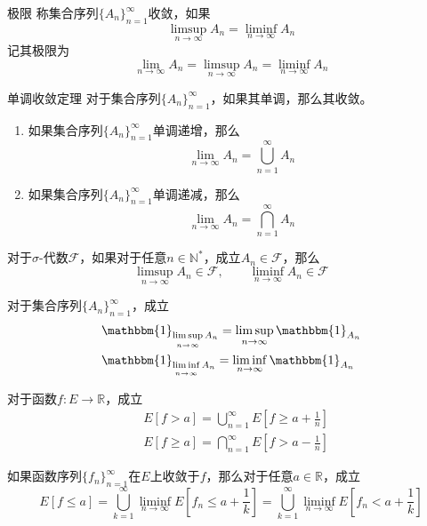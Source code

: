 \documentclass[lang = cn, scheme = chinese, thmcnt = section]{elegantbook}
\newcommand{\N}{\mathbb{N}}            %
\newcommand{\R}{\mathbb{R}}            %
\begin{document}
\begin{definition}{极限}
	称集合序列$\{ A_n \}_{n=1}^{\infty}$收敛，如果
	$$
	\limsup_{n\to\infty}{A_n}=\liminf_{n\to\infty}{A_n}
	$$
	记其极限为
	$$
	\lim_{n\to\infty}{A_n}=\limsup_{n\to\infty}{A_n}=\liminf_{n\to\infty}{A_n}
	$$
\end{definition}

\begin{theorem}{单调收敛定理}
	对于集合序列$\{ A_n \}_{n=1}^{\infty}$，如果其单调，那么其收敛。
	\begin{enumerate}
		\item 如果集合序列$\{ A_n \}_{n=1}^{\infty}$单调递增，那么
		$$
		\lim_{n\to\infty}{A_n}=\bigcup_{n=1}^{\infty}{A_n}
		$$
		\item 如果集合序列$\{ A_n \}_{n=1}^{\infty}$单调递减，那么
		$$
		\lim_{n\to\infty}{A_n}=\bigcap_{n=1}^{\infty}{A_n}
		$$
	\end{enumerate}
\end{theorem}

\begin{theorem}
	对于$\sigma$-代数$\mathscr{F}$，如果对于任意$n\in\N^*$，成立$A_n\in\mathscr{F}$，那么
	$$
	\limsup_{n\to\infty}{A_n}\in\mathscr{F},\qquad \liminf_{n\to\infty}{A_n}\in\mathscr{F}
	$$
\end{theorem}

\begin{exercise}
	对于集合序列$\{A_n\}_{n=1}^{\infty}$，成立
	\begin{align*}
		& \mathbbm{1}_{\limsup\limits_{n\to\infty}{A_n}}
		=\limsup_{n\to\infty}\mathbbm{1}_{A_n}\\
		& \mathbbm{1}_{\liminf\limits_{n\to\infty}{A_n}}
		=\liminf_{n\to\infty}\mathbbm{1}_{A_n}
	\end{align*}
\end{exercise}

\begin{exercise}
	对于函数$f:E\to\R$，成立
	\begin{align*}
		& E[f>a]=\bigcup_{n=1}^{\infty}E\left[ f\ge a+\frac{1}{n} \right]\\
		& E[f\ge a]=\bigcap_{n=1}^{\infty}E\left[ f> a-\frac{1}{n} \right]
	\end{align*}
\end{exercise}

\begin{exercise}
	如果函数序列$\{f_n\}_{n=1}^{\infty}$在$E$上收敛于$f$，那么对于任意$a\in\R$，成立%
	$$
	E[f\le a]
	=\bigcup_{k=1}^{\infty}\liminf_{n\to\infty}E\left[ f_n\le a+\frac{1}{k} \right]
	=\bigcup_{k=1}^{\infty}\liminf_{n\to\infty}E\left[ f_n < a+\frac{1}{k} \right]
	$$
\end{exercise}
\end{document}
